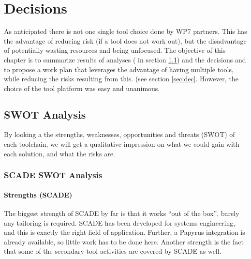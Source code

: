 
\newcommand{\decision}[1]{
\begin{center}
\begin{tabular}{ p{13cm} }
\stepcounter{decision}\textbf{Decision~\arabic{decision}}  \\
\hline
\multicolumn{1}{|p{13cm}|}{#1} \\
\hline
\end{tabular}
\end{center}
}


\chapter{Decisions}
\label{sec:decision}

As anticipated there is not one single tool choice done by WP7 partners. This has the advantage of reducing risk (if a tool does not work out), but the disadvantage of potentially wasting resources and being unfocused.  The objective of this chapter is to summarize results of analyses ( in section \ref{sec:swot}) and the decisions and to propose a work plan that leverages the advantage of having multiple tools, while reducing the risks resulting from this. (see section \ref{sec:dec}.  However, the choice of the tool platform was easy and unanimous.

\section{SWOT Analysis}
\label{sec:swot}

By looking a the strengths, weaknesses, opportunities and threats (SWOT) of each toolchain, we will get a qualitative impression on what we could gain with each solution, and what the risks are.

\subsection{SCADE SWOT Analysis}

\subsubsection{Strengths (SCADE)}

The biggest strength of SCADE by far is that it works ``out of the box'', barely any tailoring is required.  SCADE has been developed for systems engineering, and this is exactly the right field of application.  Further, a Papyrus integration is already available, so little work has to be done here.  Another strength is the fact that some of the secondary tool activities are covered by SCADE as well.

